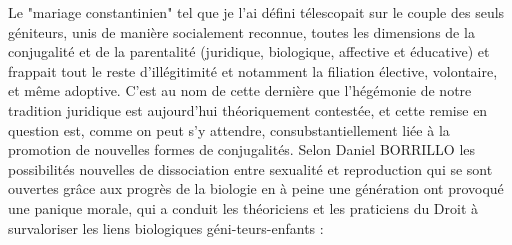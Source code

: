  Le "mariage constantinien" tel que je l'ai défini télescopait sur le couple des seuls géniteurs, unis de manière socialement reconnue, toutes les dimensions de la conjugalité et de la parentalité (juridique, biologique, affective et éducative) et frappait tout le reste d'illégitimité et notamment la filiation élective, volontaire, et même adoptive. C'est au nom de cette dernière que l'hégémonie de notre tradition juridique est aujourd’hui théoriquement contestée, et cette remise en question est, comme on peut s'y attendre, consubstantiellement liée à la promotion de nouvelles formes de conjugalités. Selon Daniel BORRILLO  les possibilités nouvelles de dissociation entre sexualité et reproduction qui se sont ouvertes grâce aux progrès de la biologie en à peine une génération ont provoqué une panique morale, qui a conduit les théoriciens et les praticiens du Droit à survaloriser les liens biologiques géni-teurs-enfants :
